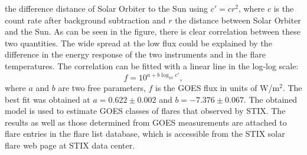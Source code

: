 \documentclass[referee]{aa} %
\begin{document}
the difference distance of Solar Orbiter to the Sun using $c'=c r^2$, where $c$ is the count rate after background subtraction
 and $r$ the distance between Solar Orbiter and the Sun. 
As can be seen in the figure, there is clear correlation between
these two quantities.  The wide spread at the low flux could be explained by the difference in 
the energy response of the two instruments and in the flare temperatures.
The correlation can be fitted with a linear line in the log-log scale: 
\begin{equation}
f=10^{a+b\log_{10} c'}, 
\label{eq:goes-stix}
\end{equation}
where $a$ and $b$ are two free parameters, $f$ is the GOES flux  in units of W/m$^2$.
 The best fit was obtained at $a=0.622\pm 0.002$ and $b=-7.376\pm0.067$.
The obtained model is used to estimate  GOES classes 
 of flares that observed by STIX. 
The results as well as those determined from GOES measurements
are attached to flare entries in the flare list database, which is accessible 
from the STIX solar flare web page at STIX data center. 
\end{document}
